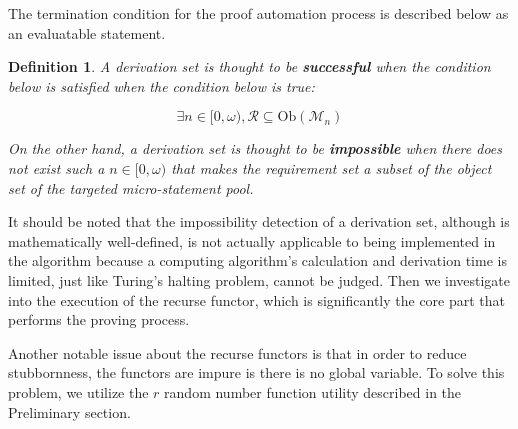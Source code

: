 \documentclass{aims}
\newtheorem{definition}{Definition}	%
\numberwithin{theorem}{section}	%
\numberwithin{axiom}{section}	%
\numberwithin{definition}{section}	%
\begin{document}
The termination condition for the proof automation process is described below as an evaluatable statement. 

\begin{definition}
	A derivation set is thought to be \textbf{ successful} when the condition below is satisfied when the condition below is true:
	
	\begin{equation}
		\exists n\in [0,\omega ), \mathcal{R}\subseteq \text{Ob}\left(\mathcal{M}_n\right)
	\end{equation}
	
	On the other hand, a derivation set is thought to be \textbf{ impossible} when there does not exist such a \(n\in [0,\omega )\) that makes the requirement set a subset of the object set of the targeted micro-statement pool.
\end{definition}

It should be noted that the impossibility detection of a derivation set, although is mathematically well-defined, is not actually applicable to being implemented in the algorithm because a computing algorithm{'}s calculation and derivation time is limited, just like Turing{'}s halting problem, cannot be judged. Then we investigate into the execution of the recurse functor, which is significantly the core part that performs the proving process.

Another notable issue about the recurse functors is that in order to reduce stubbornness, the functors are impure is there is no global variable. To solve this problem, we utilize the \(\mathit{r}\) random number function utility described in the Preliminary section.
\end{document}

